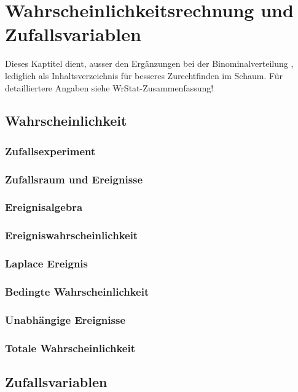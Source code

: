 \section{Wahrscheinlichkeitsrechnung und Zufallsvariablen }
Dieses Kaptitel dient, ausser den Ergänzungen bei der Binominalverteilung
 \normalsize, lediglich als Inhaltsverzeichnis für besseres
Zurechtfinden im Schaum.
Für detailliertere Angaben siehe WrStat-Zusammenfassung!

\subsection{Wahrscheinlichkeit }
\subsubsection{Zufallsexperiment }
\subsubsection{Zufallsraum und Ereignisse }
\subsubsection{Ereignisalgebra }
\subsubsection{Ereigniswahrscheinlichkeit }
\subsubsection{Laplace Ereignis }
\subsubsection{Bedingte Wahrscheinlichkeit }
\subsubsection{Unabhängige Ereignisse }
\subsubsection{Totale Wahrscheinlichkeit }
\vspace{0.25cm}

\subsection{Zufallsvariablen }

